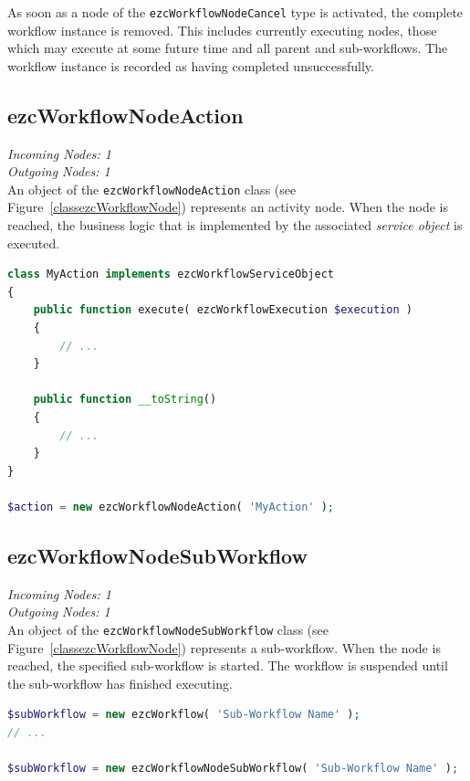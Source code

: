 As soon as a node of the \texttt{ezcWorkflowNodeCancel} type is activated, the
complete workflow instance is removed. This includes currently executing nodes,
those which may execute at some future time and all parent and sub-workflows.
The workflow instance is recorded as having completed unsuccessfully.

\subsection{ezcWorkflowNodeAction}

\emph{Incoming Nodes: 1}\\
\emph{Outgoing Nodes: 1}\\

An object of the \texttt{ezcWorkflowNodeAction} class (see
Figure~\ref{classezcWorkflowNode}) represents an activity node. When the node
is reached, the business logic that is implemented by the associated
\emph{service object} is executed.

\begin{lstlisting}[language=PHP]
class MyAction implements ezcWorkflowServiceObject
{
    public function execute( ezcWorkflowExecution $execution )
    {
        // ...
    }

    public function __toString()
    {
        // ...
    }
}

$action = new ezcWorkflowNodeAction( 'MyAction' );
\end{lstlisting}

\subsection{ezcWorkflowNodeSubWorkflow}

\emph{Incoming Nodes: 1}\\
\emph{Outgoing Nodes: 1}\\

An object of the \texttt{ezcWorkflowNodeSubWorkflow} class (see
Figure~\ref{classezcWorkflowNode}) represents a sub-workflow. When the node
is reached, the specified sub-workflow is started. The workflow is suspended
until the sub-workflow has finished executing.

\begin{lstlisting}[language=PHP]
$subWorkflow = new ezcWorkflow( 'Sub-Workflow Name' );
// ...

$subWorkflow = new ezcWorkflowNodeSubWorkflow( 'Sub-Workflow Name' );
\end{lstlisting}

